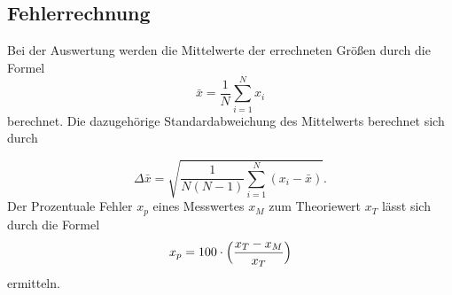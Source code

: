 \subsection{Fehlerrechnung}
Bei der Auswertung werden die Mittelwerte 
der errechneten Größen durch die Formel
\begin{equation}
    \bar{x}=\frac{1}{N}\sum_{i=1}^N x_i
    \label{eq:2}
\end{equation}
berechnet. Die dazugehörige Standardabweichung
des Mittelwerts berechnet sich durch

 \begin{equation}
     \Delta\bar{x}=\sqrt{\frac{1}{N(N-1)}\sum_{i=1}^N (x_i-\bar{x})}.
     \label{eq:5}
 \end{equation}
\noindent Der Prozentuale Fehler $x_p$ eines
Messwertes $x_M$ zum Theoriewert $x_T$ lässt sich durch
die Formel
\begin{equation}
    x_p=100 \cdot \Bigl(\frac{x_T-x_M}{x_T}\Bigr)
\end{equation}
\noindent ermitteln.
